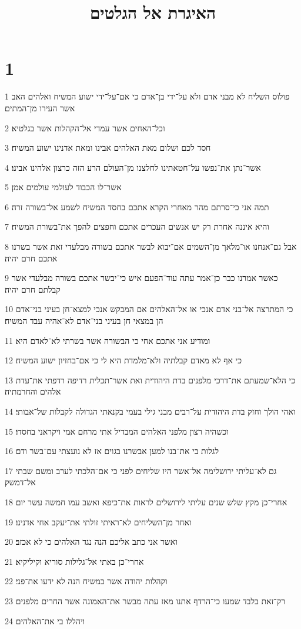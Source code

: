 

\title{האיגרת אל הגלטים}


\chapter{1}

\par 1 פולוס השליח לא מבני אדם ולא על־ידי בן־אדם כי אם־על־ידי ישוע המשיח ואלהים האב אשר העירו מן־המתים׃
\par 2 וכל־האחים אשר עמדי אל־הקהלות אשר בגלטיא׃
\par 3 חסד לכם ושלום מאת האלהים אבינו ומאת אדנינו ישוע המשיח׃
\par 4 אשר־נתן את־נפשו על־חטאתינו לחלצנו מן־העולם הרע הזה כרצון אלהינו אבינו׃
\par 5 אשר־לו הכבוד לעולמי עולמים אמן׃
\par 6 תמה אני כי־סרתם מהר מאחרי הקרא אתכם בחסד המשיח לשמע אל־בשורה זרה׃
\par 7 והיא איננה אחרת רק יש אנשים העכרים אתכם וחפצים להפך את־בשורת המשיח׃
\par 8 אבל גם־אנחנו או־מלאך מן־השמים אם־יבוא לבשר אתכם בשורה מבלעדי זאת אשר בשרנו אתכם חרם יהיה׃
\par 9 כאשר אמרנו כבר כן־אמר עתה עוד־הפעם איש כי־יבשר אתכם בשורה מבלעדי אשר קבלתם חרם יהיה׃
\par 10 כי המתרצה אל־בני אדם אנכי או אל־האלהים אם המבקש אנכי למצא־חן בעיני בני־אדם הן במצאי חן בעיני בני־אדם לא־אהיה עבד המשיח׃
\par 11 ומודיע אני אתכם אחי כי הבשורה אשר בשרתי לא־לאדם היא׃
\par 12 כי אף לא מאדם קבלתיה ולא־מלמדת היא לי כי אם־בחזיון ישוע המשיח׃
\par 13 כי הלא־שמעתם את־דרכי מלפנים בדת היהודית ואת אשר־תכלית רדיפה רדפתי את־עדת אלהים והחרמתיה׃
\par 14 ואהי הולך וחזק בדת היהודית על־רבים מבני גילי בעמי בקנאתי הגדולה לקבלות של־אבותי׃
\par 15 וכשהיה רצון מלפני האלהים המבדיל אתי מרחם אמי ויקראני בחסדו׃
\par 16 לגלות בי את־בנו למען אבשרנו בגוים אז לא נועצתי עם־בשר ודם׃
\par 17 גם לא־עליתי ירושלימה אל־אשר היו שליחים לפני כי אם־הלכתי לערב ומשם שבתי אל־דמשק׃
\par 18 אחרי־כן מקץ שלש שנים עליתי לירושלים לראות את־כיפא ואשב עמו חמשה עשר יום׃
\par 19 ואחר מן־השליחים לא־ראיתי זולתי את־יעקב אחי אדנינו׃
\par 20 ואשר אני כתב אליכם הנה נגד האלהים כי לא אכזב׃
\par 21 אחרי־כן באתי אל־גלילות סוריא וקיליקיא׃
\par 22 וקהלות יהודה אשר במשיח הנה לא ידעו את־פני׃
\par 23 רק־זאת בלבד שמעו כי־הרדף אתנו מאז עתה מבשר את־האמונה אשר החרים מלפנים׃
\par 24 ויהללו בי את־האלהים׃

